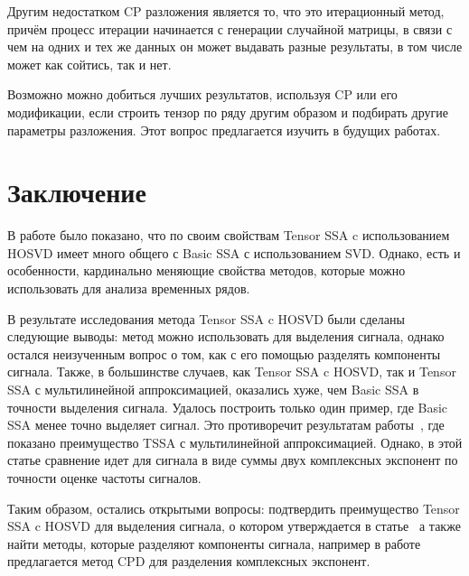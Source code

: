 \documentclass[specialist,
    substylefile = spbu_report.rtx,
    subf,href,colorlinks=true, 12pt]{disser}
\theoremstyle{plain}
\theoremstyle{definition}
\theoremstyle{remark}
\begin{document}
    Другим недостатком CP разложения является то, что это итерационный метод, причём процесс итерации начинается
    с генерации случайной матрицы, в связи с чем на одних и тех же данных он может выдавать разные результаты, в том
    числе может как сойтись, так и нет.

    Возможно можно добиться лучших результатов, используя CP или его модификации, если строить тензор по ряду другим образом и подбирать
    другие параметры разложения.
    Этот вопрос предлагается изучить в будущих работах.
    \newpage


    \section{Заключение}\label{sec:conclusion}
    В работе было показано, что по своим свойствам Tensor SSA c использованием HOSVD имеет много общего с Basic SSA с использованием SVD.
    Однако, есть и особенности, кардинально меняющие свойства методов, которые можно использовать для анализа временных рядов.

    В результате исследования метода Tensor SSA c HOSVD были сделаны следующие выводы:
    метод можно использовать для выделения сигнала, однако остался неизученным вопрос о том,
    как с его помощью разделять компоненты сигнала.
    Также, в большинстве случаев, как Tensor SSA c HOSVD, так и Tensor SSA с мультилинейной аппроксимацией, оказались хуже,
    чем Basic SSA в точности выделения сигнала.
    Удалось построить только один пример, где Basic SSA менее точно выделяет сигнал.
    Это противоречит результатам работы~\cite{hosvd-hooi-separation}, где показано преимущество TSSA с мультилинейной аппроксимацией.
    Однако, в этой статье сравнение идет для сигнала в виде суммы двух комплексных экспонент по точности оценке частоты сигналов.

    Таким образом, остались открытыми вопросы: подтвердить преимущество Tensor SSA c HOSVD для выделения сигнала,
    о котором утверждается в статье~\cite{hosvd-hooi-separation} а также найти методы, которые разделяют компоненты сигнала,
    например в работе~\cite{cpd-separation} предлагается метод CPD для разделения комплексных экспонент.

    
    
\end{document}
